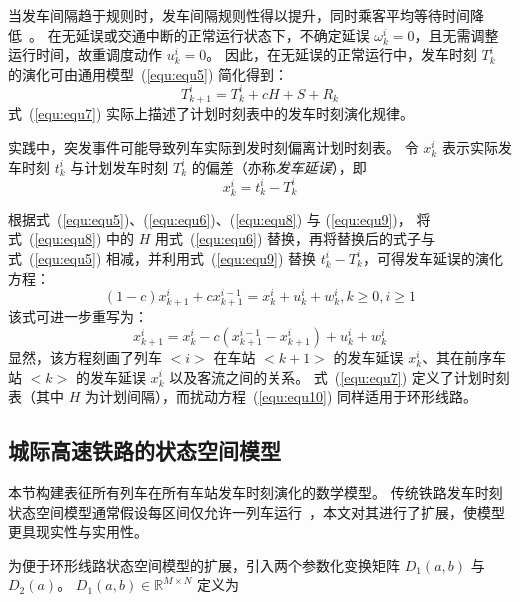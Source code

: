 当发车间隔趋于规则时，发车间隔规则性得以提升，同时乘客平均等待时间降低~\cite{b23}。
在无延误或交通中断的正常运行状态下，不确定延误 $\omega_k^i=0$，且无需调整运行时间，故重调度动作 $u_k^i = 0$。
因此，在无延误的正常运行中，发车时刻 $T_k^i$ 的演化可由通用模型~(\ref{equ:equ5}) 简化得到：
\begin{equation}
    T_{k+1}^{i}=T_{k}^{i}+cH+S+R_{k}
    \label{equ:equ8}
\end{equation}
式~(\ref{equ:equ7}) 实际上描述了计划时刻表中的发车时刻演化规律。

实践中，突发事件可能导致列车实际到发时刻偏离计划时刻表。
令 $x_{k}^{i}$ 表示实际发车时刻 $t_k^i$ 与计划发车时刻 $T_{k}^{i}$ 的偏差（亦称\emph{发车延误}），即
\begin{equation}
    x_{k}^{i}=t_{k}^{i}-T_{k}^{i}  
    \label{equ:equ9}
\end{equation}

根据式~(\ref{equ:equ5})、(\ref{equ:equ6})、(\ref{equ:equ8}) 与 (\ref{equ:equ9})，
将式~(\ref{equ:equ8}) 中的 $H$ 用式~(\ref{equ:equ6}) 替换，再将替换后的式子与式~(\ref{equ:equ5}) 相减，并利用式~(\ref{equ:equ9}) 替换 $t_{k}^{i}-T_{k}^{i}$，可得发车延误的演化方程：
\begin{equation}
    (1-c)x_{k+1}^{i}+cx_{k+1}^{i-1}=x_{k}^{i}+u_{k}^{i}+w_{k}^{i},k\geq0,i\geq1
    \label{equ:equ10}
\end{equation}
该式可进一步重写为：
\begin{equation*}
    x_{k+1}^i=x_k^i-c\left(x_{k+1}^{i-1}-x_{k+1}^i\right)+u_k^i+w_k^i
\end{equation*}
显然，该方程刻画了列车 $<i>$ 在车站 $<k+1>$ 的发车延误 $x_k^i$、其在前序车站 $<k>$ 的发车延误 $x_k^i$ 以及客流之间的关系。
式~(\ref{equ:equ7}) 定义了计划时刻表（其中 $H$ 为计划间隔），而扰动方程~(\ref{equ:equ10}) 同样适用于环形线路。

\subsection{城际高速铁路的状态空间模型}
\label{2.C}
本节构建表征所有列车在所有车站发车时刻演化的数学模型。
传统铁路发车时刻状态空间模型通常假设每区间仅允许一列车运行~\cite{b21}，本文对其进行了扩展，使模型更具现实性与实用性。

为便于环形线路状态空间模型的扩展，引入两个参数化变换矩阵 $D_1(a,b)$ 与 $D_2(a)$。
$D_{1}(a,b)\in \mathbb{R}^{M \times N}$ 定义为

